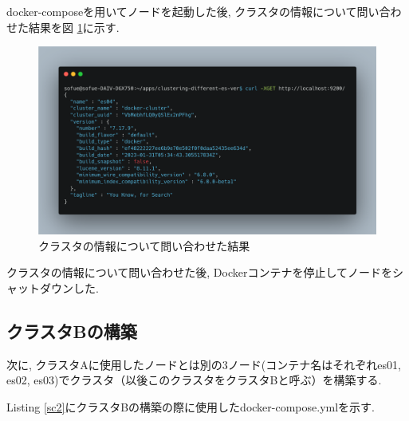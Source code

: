 \documentclass[a4j,12pt,]{jarticle}
\begin{document}
docker-composeを用いてノードを起動した後, クラスタの情報について問い合わせた結果を図 \ref{p1-1}に示す.

\begin{figure}[H]
  \begin{center}
    \includegraphics[width=160mm]{es04-cluster.png}
    \caption{クラスタの情報について問い合わせた結果}
    \label{p1-1}
  \end{center}
\end{figure}

クラスタの情報について問い合わせた後, Dockerコンテナを停止してノードをシャットダウンした.

\subsection{クラスタBの構築}

次に, クラスタAに使用したノードとは別の3ノード(コンテナ名はそれぞれes01, es02, es03)でクラスタ（以後このクラスタをクラスタBと呼ぶ）を構築する.

Listing \ref{sc2}にクラスタBの構築の際に使用したdocker-compose.ymlを示す.

\end{document}
